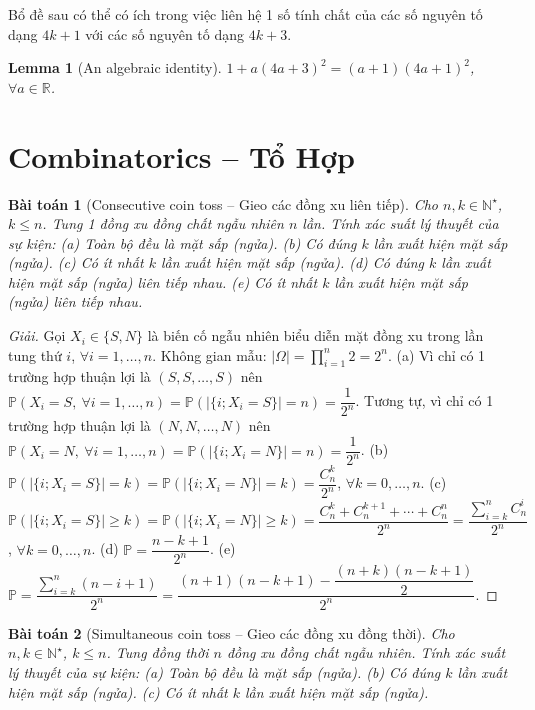 \documentclass{article}
\newtheorem{baitoan}{Bài toán}
\newtheorem{lemma}{Lemma}
\begin{document}
Bổ đề sau có thể có ích trong việc liên hệ 1 số tính chất của các số nguyên tố dạng $4k + 1$ với các số nguyên tố dạng $4k + 3$.

\begin{lemma}[An algebraic identity]
	$1 + a(4a + 3)^2 = (a + 1)(4a + 1)^2$, $\forall a\in\mathbb{R}$.
\end{lemma}


\section{Combinatorics -- Tổ Hợp}
\label{sect: combinatorics}

\begin{baitoan}[Consecutive coin toss -- Gieo các đồng xu liên tiếp]
	Cho $n,k\in\mathbb{N}^\star$, $k\le n$. Tung 1 đồng xu đồng chất ngẫu nhiên $n$ lần. Tính xác suất lý thuyết của sự kiện: (a) Toàn bộ đều là mặt sấp (ngửa). (b) Có đúng $k$ lần xuất hiện mặt sấp (ngửa). (c) Có ít nhất $k$ lần xuất hiện mặt sấp (ngửa). (d) Có đúng $k$ lần xuất hiện mặt sấp (ngửa) liên tiếp nhau. (e) Có ít nhất $k$ lần xuất hiện mặt sấp (ngửa) liên tiếp nhau.
\end{baitoan}

\begin{proof}[Giải]
	Gọi $X_i\in\{S,N\}$ là biến cố ngẫu nhiên biểu diễn mặt đồng xu trong lần tung thứ $i$, $\forall i = 1,\ldots,n$. Không gian mẫu: $|\Omega| = \prod_{i=1}^n 2 = 2^n$. (a) Vì chỉ có 1 trường hợp thuận lợi là $(S,S,\ldots,S)$ nên $\mathbb{P}(X_i = S,\ \forall i = 1,\ldots,n) = \mathbb{P}(|\{i;X_i = S\}| = n) = \dfrac{1}{2^n}$. Tương tự, vì chỉ có 1 trường hợp thuận lợi là $(N,N,\ldots,N)$ nên $\mathbb{P}(X_i = N,\ \forall i = 1,\ldots,n) = \mathbb{P}(|\{i;X_i = N\}| = n) = \dfrac{1}{2^n}$. (b) $\mathbb{P}(|\{i;X_i = S\}| = k) = \mathbb{P}(|\{i;X_i = N\}| = k) = \dfrac{C_n^k}{2^n}$, $\forall k = 0,\ldots,n$. (c) $\mathbb{P}(|\{i;X_i = S\}|\ge k) = \mathbb{P}(|\{i;X_i = N\}|\ge k) = \dfrac{C_n^k + C_n^{k+1} + \cdots + C_n^n}{2^n} = \dfrac{\sum_{i=k}^n C_n^i}{2^n}$, $\forall k = 0,\ldots,n$. (d) $\mathbb{P} = \dfrac{n - k + 1}{2^n}$. (e) $\mathbb{P} = \dfrac{\sum_{i=k}^n (n - i + 1)}{2^n} = \dfrac{(n + 1)(n - k + 1) - \dfrac{(n + k)(n - k + 1)}{2}}{2^n}$.
	
\end{proof}

\begin{baitoan}[Simultaneous coin toss -- Gieo các đồng xu đồng thời]
	Cho $n,k\in\mathbb{N}^\star$, $k\le n$. Tung đồng thời $n$ đồng xu đồng chất ngẫu nhiên. Tính xác suất lý thuyết của sự kiện: (a) Toàn bộ đều là mặt sấp (ngửa). (b) Có đúng $k$ lần xuất hiện mặt sấp (ngửa). (c) Có ít nhất $k$ lần xuất hiện mặt sấp (ngửa).
\end{baitoan}
\end{document}
